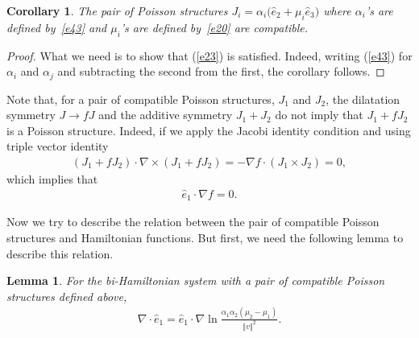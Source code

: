 \documentclass[pdftex]{sigma}
\numberwithin{equation}{section}
\newtheorem{Corollary}[Theorem]{Corollary}
\newtheorem{Lemma}[Theorem]{Lemma}
\begin{document}
\begin{Corollary}\label{corollary1}
The pair of Poisson structures $J_{i}=\alpha _{i}\big( \widehat{e}_{2}+\mu_{i}\widehat{e}_{3}\big) $ where $\alpha _{i}$'s are defined by~\eqref{e43} and $\mu _{i}$'s are defined by~\eqref{e20} are compatible.
\end{Corollary}

\begin{proof}
What we need is to show that (\ref{e23}) is satisf\/ied. Indeed, writing (\ref{e43}) for $\alpha _{i}$ and $\alpha_{j}$ and subtracting the second from the f\/irst, the corollary follows.
\end{proof}

Note that, for a pair of compatible Poisson structures, $J_{1}$ and $J_{2}$, the dilatation symmetry $J\rightarrow fJ$ and the additive symmetry $J_{1}+J_{2}$ do not imply that $J_{1}+fJ_{2}$ is a Poisson structure. Indeed, if we apply the Jacobi identity condition and using triple vector identity
\begin{gather*}
( J_{1}+fJ_{2}) \cdot \nabla \times (J_{1}+fJ_{2})=-\nabla f\cdot ( J_{1}\times J_{2}) =0,
\end{gather*}
which implies that
\begin{gather*}
\widehat{e}_{1}\cdot \nabla f=0.
\end{gather*}

Now we try to describe the relation between the pair of compatible Poisson structures and Hamiltonian functions. But f\/irst, we need the following lemma to describe this relation.

\begin{Lemma}\label{lemma1}
For the bi-Hamiltonian system with a pair of compatible Poisson structures defined above,
\begin{gather*}
\nabla \cdot \widehat{e}_{1}=\widehat{e}_{1}\cdot \nabla \ln \frac{\alpha_{1}\alpha _{2}( \mu _{2}-\mu _{1}) }{\Vert v\Vert ^{2}}.
\end{gather*}
\end{Lemma}
\end{document}
